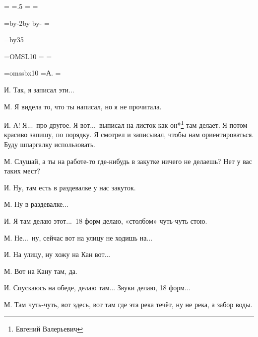 \pdfpagewidth=297mm
\pdfpageheight=210mm
\pdfhorigin=1in
\pdfvorigin=0pt

\shhtotal=\pdfpagewidth
\htotal=.5\shhtotal
\vtotal=\pdfpageheight
\shoutline=0pt
\shstaplewidth=0pt
\shcrop=0pt
\shfootline={}
\shthickness=0pt %

\horigin=9mm
\hoffset=-9mm
\hsize=\htotal \advance\hsize by-2\horigin \advance\hsize by\hoffset
\advance\horigin by-\hoffset
\output={\ifodd\pageno\hoffset=0pt\fi \plainoutput}

\vorigin=15mm
\vsize=\topskip \advance\vsize by35\baselineskip

\font\TENSL=OMSL10
\headline={\line{\hrulefill}}
\footline={\line{\hss\tenrm\folio\hss}}

\font\speakerF=omssbx10
\def\I{\item{\speakerF И.}}
\def\M{\item{\speakerF М.}}
=\hbox{\speakerF А.\enskip}
\parindent=


\I
Так, я записал эти...

\M
Я видела то, что ты написал, но я не прочитала.

\I
А! Я...\ про другое. Я вот...\ выписал на листок как он*\footnote{Евгений Валерьевич} там делает.
Я потом красиво запишу, по порядку.
Я смотрел и записывал, чтобы нам ориентироваться.
Буду шпаргалку использовать.

\M
Слушай, а ты на работе-то где-нибудь в закутке ничего не делаешь?
Нет у вас таких мест?

\I
Ну, там есть в раздевалке у нас закуток.

\M
Ну в раздевалке...

\I
Я там делаю этот...\
18 форм делаю, «столбом» чуть-чуть стою.

\M
Не...\ ну, сейчас вот на улицу не ходишь на...

\I
На улицу, ну хожу на Кан вот...

\M
Вот на Кану там, да.

\I
Спускаюсь на обеде, делаю там...
Звуки делаю, 18 форм...

\M
Там чуть-чуть, вот здесь, вот там где эта река течёт, ну не река, а забор воды.

